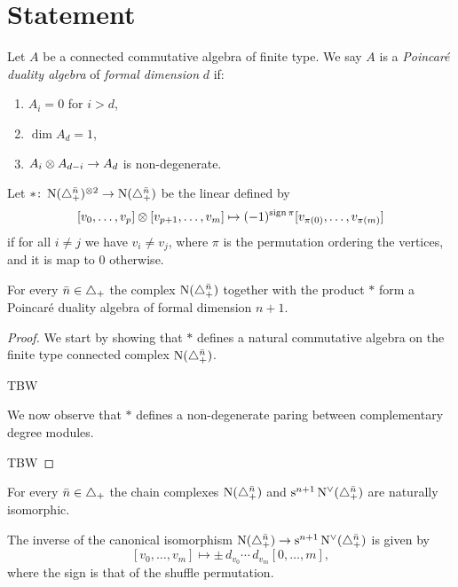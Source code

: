 
\section{Statement} \label{s:statement}


\begin{definition}
	Let $A$ be a connected commutative algebra of finite type.
	We say $A$ is a \textit{Poincar\'e duality algebra} of \textit{formal dimension} $d$ if:
	\begin{enumerate}
		\item $A_i = 0$ for $i > d$,
		\item $\dim A_d = 1$,
		\item $A_i \otimes A_{d-i} \to A_d$ is non-degenerate.
	\end{enumerate}
\end{definition}

\begin{definition}
	Let $\ast \colon \operatorname{N}(\triangle_{+}^{\bar{n}})^{\otimes 2} \to \operatorname{N}(\triangle_{+}^{\bar{n}})$ be the linear defined by
	\[
	[v_0, \dots, v_p] \otimes [v_{p+1},\dots,v_{m}] \mapsto
	(-1)^{\operatorname{sign} \pi}[v_{\pi(0)}, \dots, v_{\pi(m)}]
	\]
	if for all $i \neq j$ we have $v_i \neq v_j$, where $\pi$ is the permutation ordering the vertices, and it is map to $0$ otherwise.
\end{definition}

\begin{theorem}
	For every $\bar{n} \in \triangle_{+}$ the complex $\operatorname{N}(\triangle_{+}^{\bar{n}})$ together with the product $\ast$ form a Poincar\'e duality algebra of formal dimension $n+1$.
\end{theorem}

\begin{proof}
	We start by showing that $\ast$ defines a natural commutative algebra on the finite type connected complex $\operatorname{N}(\triangle_{+}^{\bar{n}})$.

	TBW

	We now observe that $\ast$ defines a non-degenerate paring between complementary degree modules.

	TBW
\end{proof}

\begin{corollary}
	For every $\bar{n} \in \triangle_{+}$ the chain complexes $\operatorname{N}(\triangle_{+}^{\bar{n}})$ and $\mathrm{s}^{n+1}\operatorname{N^{\vee}}(\triangle_{+}^{\bar{n}})$ are naturally isomorphic.
\end{corollary}

The inverse of the canonical isomorphism $\operatorname{N}(\triangle_{+}^{\bar{n}}) \to \mathrm{s}^{n+1}\operatorname{N^{\vee}}(\triangle_{+}^{\bar{n}})$ is given by
\[
[v_0, \dots, v_m] \mapsto \pm \, d_{v_0} \dotsm \, d_{v_m} [0, \dots, m],
\]
where the sign is that of the shuffle permutation.
